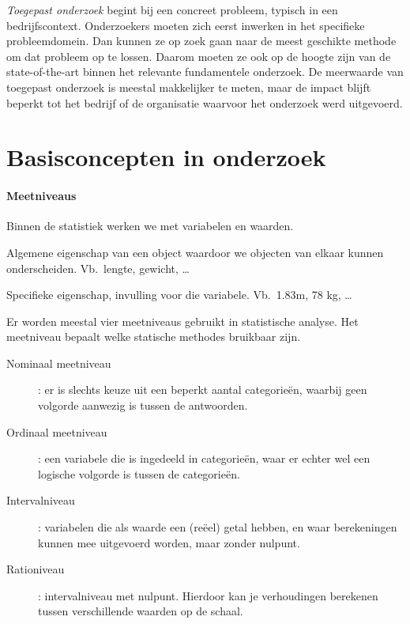 \emph{Toegepast onderzoek} begint bij een concreet probleem, typisch in een bedrijfscontext. Onderzoekers moeten zich eerst inwerken in het specifieke probleemdomein. Dan kunnen ze op zoek gaan naar de meest geschikte methode om dat probleem op te lossen. Daarom moeten ze ook op de hoogte zijn van de state-of-the-art binnen het relevante fundamentele onderzoek. De meerwaarde van toegepast onderzoek is meestal makkelijker te meten, maar de impact blijft beperkt tot het bedrijf of de organisatie waarvoor het onderzoek werd uitgevoerd.

\section{Basisconcepten in onderzoek}
\label{sec:onderzoeksproces-basisconcepten}

\paragraph{Meetniveaus}

Binnen de statistiek werken we met variabelen en waarden.

\begin{definition}[Variabele] 
  Algemene eigenschap van een object waardoor we objecten van elkaar kunnen onderscheiden. Vb.~lengte, gewicht, \ldots
\end{definition}  
\begin{definition}[Waarde]
  Specifieke eigenschap, invulling voor die variabele. Vb.~1.83m, 78 kg, \ldots
\end{definition}

Er worden meestal vier meetniveaus gebruikt in statistische analyse. Het meetniveau bepaalt welke statische methodes bruikbaar zijn.

\begin{description}
  \item [Nominaal meetniveau] : er is slechts keuze uit een beperkt aantal categorie\"en, waarbij geen volgorde aanwezig is tussen de antwoorden.
  \item [Ordinaal meetniveau] : een variabele die is ingedeeld in categorie\"en, waar er echter wel een logische volgorde is tussen de categorie\"en. 
  \item [Intervalniveau] : variabelen die als waarde een (re\"eel) getal hebben, en waar berekeningen kunnen mee uitgevoerd worden, maar zonder nulpunt.
  \item [Rationiveau] : intervalniveau met nulpunt. Hierdoor kan je verhoudingen berekenen tussen verschillende waarden op de schaal.
\end{description}


